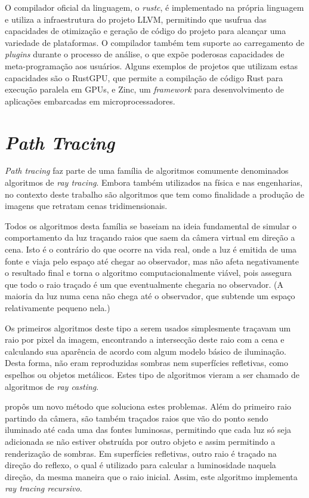 \documentclass[tg]{mdtufsm}
\begin{document}
O compilador oficial da linguagem, o \emph{rustc}, é implementado na própria linguagem e utiliza a
infraestrutura do projeto LLVM\citep{lattner2004}, permitindo que usufrua das capacidades de
otimização e geração de código do projeto para alcançar uma variedade de plataformas. O compilador
também tem suporte ao carregamento de \emph{plugins} durante o processo de análise, o que expõe
poderosas capacidades de meta-programação aos usuários. Alguns exemplos de projetos que utilizam
estas capacidades são o RustGPU\citep{holk2013}, que permite a compilação de código Rust para
execução paralela em GPUs, e Zinc\citep{zinc}, um \emph{framework} para desenvolvimento de
aplicações embarcadas em microprocessadores.

\section{\emph{Path Tracing}}

\emph{Path tracing} faz parte de uma família de algoritmos comumente denominados algoritmos de
\emph{ray tracing}. Embora também utilizados na física e nas engenharias, no contexto deste trabalho
são algoritmos que tem como finalidade a produção de imagens que retratam cenas tridimensionais.

Todos os algoritmos desta família se baseiam na ideia fundamental de simular o comportamento da luz
traçando raios que saem da câmera virtual em direção a cena. Isto é o contrário do que ocorre na
vida real, onde a luz é emitida de uma fonte e viaja pelo espaço até chegar ao observador, mas não
afeta negativamente o resultado final e torna o algoritmo computacionalmente viável, pois assegura
que todo o raio traçado é um que eventualmente chegaria no observador. (A maioria da luz numa cena
não chega até o observador, que subtende um espaço relativamente pequeno nela.)\citep{pharr2010}

Os primeiros algoritmos deste tipo a serem usados simplesmente traçavam um raio por pixel da imagem,
encontrando a intersecção deste raio com a cena e calculando sua aparência de acordo com algum
modelo básico de iluminação. Desta forma, não eram reproduzidas sombras nem superfícies refletivas,
como espelhos ou objetos metálicos. Estes tipo de algoritmos vieram a ser chamado de algoritmos de
\emph{ray casting}.

 propôs um novo método que soluciona estes problemas. Além do primeiro raio
partindo da câmera, são também traçados raios que vão do ponto sendo iluminado até cada uma das
fontes luminosas, permitindo que cada luz só seja adicionada se não estiver obstruída por outro
objeto e assim permitindo a renderização de sombras. Em superfícies refletivas, outro raio é traçado
na direção do reflexo, o qual é utilizado para calcular a luminosidade naquela direção, da mesma
maneira que o raio inicial. Assim, este algoritmo implementa \emph{ray tracing recursivo}.
\end{document}
